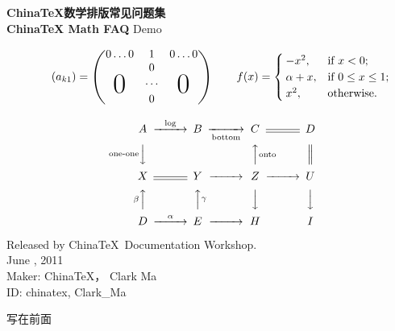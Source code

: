 \documentclass{article}
\makeatletter
\newcommand*{\Headline}[1]{\@mkboth{#1}{#1}}%
\makeatother
\begin{document}
\begin{titlepage}
\begin{center}
\textbf{\Huge \textcolor[rgb]{0.00390625, 0.43359375,0.77734375}{\qquad China\TeX{}}数学排版常见问题集}\\[\baselineskip]
\Huge \textbf{\textcolor[rgb]{0.00390625, 0.43359375,0.77734375}{\qquad China\TeX{}}  Math {\color{red}F}A\color{lightblue}Q} Demo
\vskip 3cm
\end{center}
\newcommand{\BigFig}[1]{\parbox{12pt}{\Huge #1}}
\newcommand{\BigZero}{\BigFig{0}}
\begin{equation*}
\qquad(a_{k1})=\left(
\begin{matrix}
0\ldots 0 & 1 & 0\ldots 0\\
& 0\\
\BigZero & \cdots & \BigZero\\
& 0\\
\end{matrix}
\right)
\qquad
f(x)=
\begin{cases}
-x^{2},
&\text{if $x < 0$;}\\
\alpha + x,
&\text{if $0 \leq x \leq 1$;}\\
x^{2},
&\text{otherwise.}
\end{cases}
\end{equation*}

\vskip 1cm

\[
\qquad\quad\begin{CD}
A @>\log>> B @>>\text{bottom}> C @= D \\
@V\text{one-one}VV @. @AA\text{onto}A @|\\
X @= Y @>>> Z @>>> U\\
@A\beta AA @AA\gamma A @VVV @VVV\\
D @>\alpha>> E @>>> H @. I\\
\end{CD}
\]


\vskip 3cm
\begin{flushright}
\begin{minipage}{.7\textwidth}
\flushright
\hrulefill

Released by China\TeX\ Documentation Workshop.\\
June , 2011\\
Maker: China\TeX ， Clark Ma\\
ID: chinatex, Clark\_Ma\\
\hrulefill
\end{minipage}
\end{flushright}

\end{titlepage}
\pagecolor{white}
\Headline{写在前面}
\begin{center}
{\Large{} 写在前面}
\end{center}
{}
\end{document}
